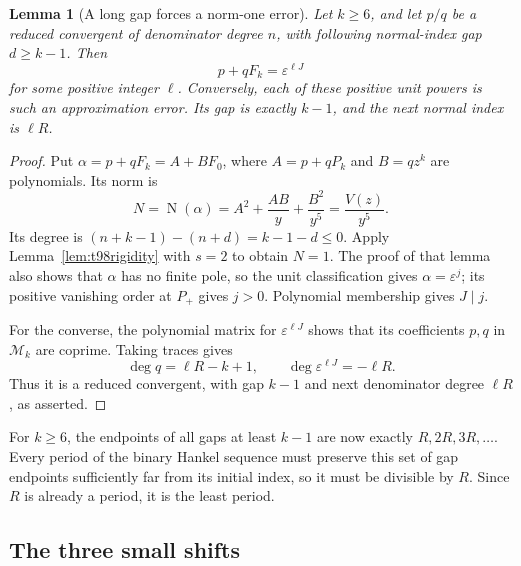 \documentclass[11pt,a4paper]{article}
\newtheorem{lemma}[theorem]{Lemma}
\theoremstyle{definition}
\theoremstyle{remark}
\begin{document}
\begin{lemma}[A long gap forces a norm-one error]
Let $k\ge6$, and let $p/q$ be a reduced convergent of denominator
degree $n$, with following normal-index gap $d\ge k-1$. Then
\[
                       p+qF_k=\varepsilon^{\ell J}
\]
for some positive integer $\ell$. Conversely, each of these positive
unit powers is such an approximation error. Its gap is exactly $k-1$,
and the next normal index is $\ell R$.
\end{lemma}

\begin{proof}
Put $\alpha=p+qF_k=A+BF_0$, where
$A=p+qP_k$ and $B=qz^k$ are polynomials. Its norm is
\[
 N=\operatorname{N}(\alpha)
   =A^2+\frac{AB}{y}+\frac{B^2}{y^5}
   =\frac{V(z)}{y^5}.
\]
Its degree is $(n+k-1)-(n+d)=k-1-d\le0$.
Apply Lemma~\ref{lem:t98rigidity} with $s=2$ to obtain $N=1$.
The proof of that lemma also shows that $\alpha$ has no finite pole,
so the unit
classification gives $\alpha=\varepsilon^j$; its positive vanishing
order at $P_+$ gives $j>0$. Polynomial membership gives $J\mid j$.

For the converse, the polynomial matrix for $\varepsilon^{\ell J}$
shows that its coefficients $p,q$ in $\mathcal M_k$ are coprime.
Taking traces gives
\[
                \deg q=\ell R-k+1,
                \qquad\deg\varepsilon^{\ell J}=-\ell R.
\]
Thus it is a reduced convergent, with gap $k-1$ and next denominator
degree $\ell R$, as asserted.
\end{proof}

For $k\ge6$, the endpoints of all gaps at least $k-1$ are now exactly
$R,2R,3R,\ldots$. Every period of the binary Hankel sequence must
preserve this set of gap endpoints sufficiently far from its initial
index, so it must be divisible by $R$. Since $R$ is already a period,
it is the least period.

\subsection{The three small shifts}
\end{document}
